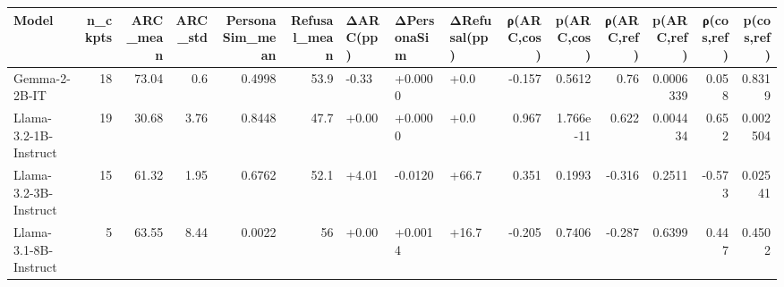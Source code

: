 \begin{tabular}{lrrrrrlllrrrrrr}
\toprule
Model & n_ckpts & ARC_mean & ARC_std & PersonaSim_mean & Refusal_mean & ΔARC(pp) & ΔPersonaSim & ΔRefusal(pp) & ρ(ARC,cos) & p(ARC,cos) & ρ(ARC,ref) & p(ARC,ref) & ρ(cos,ref) & p(cos,ref) \\
\midrule
Gemma-2-2B-IT & 18 & 73.04 & 0.6 & 0.4998 & 53.9 & -0.33 & +0.0000 & +0.0 & -0.157 & 0.5612 & 0.76 & 0.0006339 & 0.058 & 0.8319 \\
Llama-3.2-1B-Instruct & 19 & 30.68 & 3.76 & 0.8448 & 47.7 & +0.00 & +0.0000 & +0.0 & 0.967 & 1.766e-11 & 0.622 & 0.004434 & 0.652 & 0.002504 \\
Llama-3.2-3B-Instruct & 15 & 61.32 & 1.95 & 0.6762 & 52.1 & +4.01 & -0.0120 & +66.7 & 0.351 & 0.1993 & -0.316 & 0.2511 & -0.573 & 0.02541 \\
Llama-3.1-8B-Instruct & 5 & 63.55 & 8.44 & 0.0022 & 56 & +0.00 & +0.0014 & +16.7 & -0.205 & 0.7406 & -0.287 & 0.6399 & 0.447 & 0.4502 \\
\bottomrule
\end{tabular}

